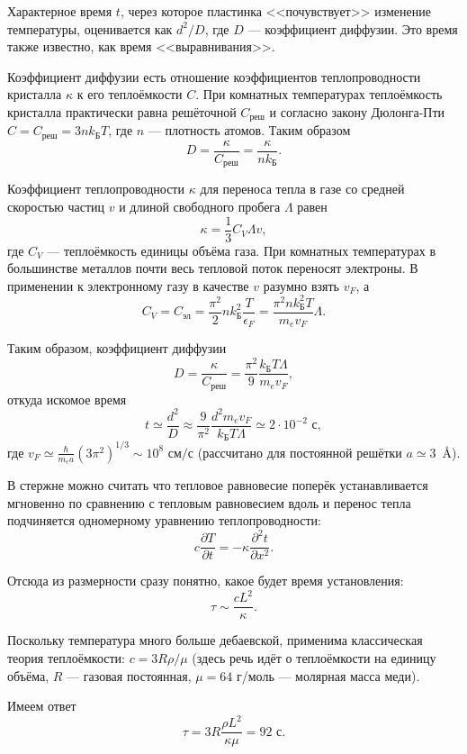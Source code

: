 \documentclass[a4paper]{article}
\begin{document}
\begin{hiProb}[3.79]
\end{hiProb}
\begin{sol}
Характерное время $t$, через которое пластинка
 <<почувствует>> изменение температуры, оценивается
как $d^2 /D$, где $D$ --- коэффициент диффузии.
Это время также известно, как время <<выравнивания>>.

Коэффициент диффузии есть отношение коэффициентов
теплопроводности кристалла $\kappa$ к его
теплоёмкости $C$. При комнатных температурах
теплоёмкость кристалла практически равна решёточной
$C_{\text{реш}}$ и согласно закону Дюлонга-Пти
$C=C_{\text{реш}}=3nk_\text{Б}T$, где $n$ ---
плотность атомов. Таким образом
\[
D= \frac{\kappa}{C_\text{реш}}=\frac{\kappa}{n k_\text{Б}}
.\] 

Коэффициент теплопроводности $\kappa$ для переноса
тепла в газе со средней
скоростью частиц $v$ и длиной свободного пробега
$\Lambda$ равен
\[
\kappa =\frac{1}{3} C_V \Lambda v
,\] 
где $C_V$ --- теплоёмкость единицы объёма газа.
При комнатных температурах в большинстве металлов
почти весь тепловой поток переносят электроны.
В применении к электронному газу в качестве $v$ 
разумно взять $v_F$, а 
\[
C_V=C_\text{эл}= \frac{\pi^2}{2} n k_\text{Б}^2
\frac{T}{\epsilon _F}= \frac{\pi^2 n k_\text{Б}^2
T}{m_e v_F} \Lambda
.\] 

Таким образом, коэффициент диффузии
\[
D= \frac{\kappa}{C_\text{реш}}= \frac{\pi^2}{9}
\frac{k_\text{Б} T \Lambda}{m_e v_F}
,\] 
откуда искомое время
\[
t \simeq \frac{d^2}{D} \approx
\frac{9}{\pi^2} \frac{d^2 m_e v_F}{k_\text{Б} T
\Lambda}\simeq 2\cdot 10^{-2} \text{ с}
,\] 
где $\displaystyle v_F \simeq \frac{\hbar }{m_e a} \left( 3\pi^2 \right) ^{1 /3}\sim 10^{8} \text{ см} / \text{с}$ 
(рассчитано для постоянной решётки $a \simeq
3$~\AA).
\end{sol}
\begin{hiProb}[3.80]
\end{hiProb}
\begin{sol}
В стержне можно считать что тепловое равновесие
поперёк устанавливается мгновенно по
сравнению с тепловым равновесием вдоль и перенос
тепла подчиняется одномерному уравнению теплопроводности:
\[
c \frac{\partial T}{\partial t} = -\kappa
\frac{\partial^2 t}{\partial x^2}
.\] 

Отсюда из размерности сразу понятно, какое будет
время установления:
\[
\tau \sim \frac{cL^2}{\kappa}
.\] 

Поскольку температура много больше дебаевской,
применима классическая теория теплоёмкости:
$c=3R \rho /\mu$ (здесь речь идёт о теплоёмкости
на единицу объёма, $R$ --- газовая постоянная,
$\mu=64$ г/моль --- молярная масса меди).

Имеем ответ
\[
\tau= 3R \frac{\rho L^2}{\kappa \mu}= 92 \text{ с}
.\] 
\end{sol}
\end{document}
